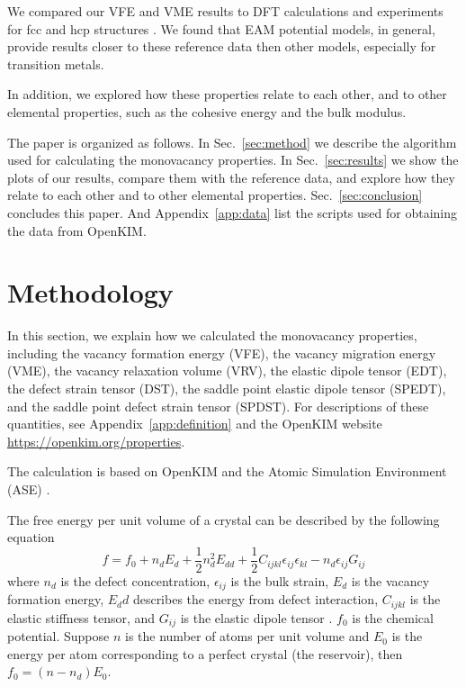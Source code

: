 \documentclass[%
 reprint,
 amsmath,amssymb,
 aps,
]{revtex4-1}
\begin{document}
We compared our VFE and VME results to DFT calculations and experiments for fcc and hcp structures \cite{angsten2014elemental}.
We found that EAM potential models, in general, provide results closer to these reference data then other models, especially for transition metals.

In addition, we explored how these properties relate to each other, and to other elemental properties, such as the cohesive energy and the bulk modulus.

The paper is organized as follows.
In Sec.~\ref{sec:method} we describe the algorithm used for calculating the monovacancy properties.
In Sec.~\ref{sec:results} we show the plots of our results, compare them with the reference data, and explore how they relate to each other and to other elemental properties.
Sec.~\ref{sec:conclusion} concludes this paper.
And Appendix~\ref{app:data} list the scripts used for obtaining the data from OpenKIM.

\section{\label{sec:method}Methodology}

In this section, we explain how we calculated the monovacancy properties, including the vacancy formation energy (VFE), the vacancy migration energy (VME), the vacancy relaxation volume (VRV), the elastic dipole tensor (EDT), the defect strain tensor (DST), the saddle point elastic dipole tensor (SPEDT), and the saddle point defect strain tensor (SPDST).
For descriptions of these quantities, see Appendix~\ref{app:definition} and the OpenKIM website \url{https://openkim.org/properties}.

The calculation is based on OpenKIM and the Atomic Simulation Environment (ASE) \cite{bahn2002object}.

The free energy per unit volume of a crystal can be described by the following equation
\begin{equation}\label{eq:f}
f = f_0 + n_dE_d + \frac{1}{2}n_d^2E_{dd} + \frac{1}{2}C_{ijkl}\epsilon_{ij}\epsilon_{kl} - n_d\epsilon_{ij}G_{ij}
\end{equation}
where $n_d$ is the defect concentration, $\epsilon_{ij}$ is the bulk strain, $E_d$ is the vacancy formation energy, $E_dd$ describes the energy from defect interaction, $C_{ijkl}$ is the elastic stiffness tensor, and $G_{ij}$ is the elastic dipole tensor \cite{freedman2009elastic}.
$f_0$ is the chemical potential.
Suppose $n$ is the number of atoms per unit volume and $E_0$ is the energy per atom corresponding to a perfect crystal (the reservoir), then $f_0 = (n - n_d) E_{0}$.
\end{document}
